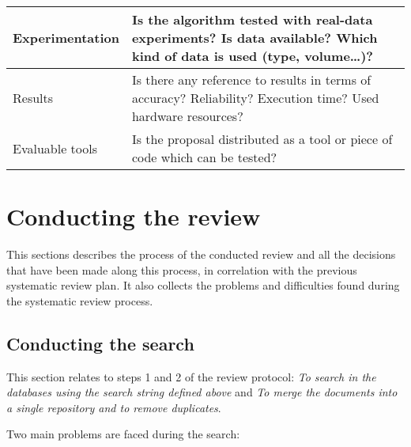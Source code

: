 \begin{table}[h]
\begin{tabular}{|p{4cm}|p{10cm}|}
\hline
Experimentation                         & Is the algorithm tested with real-data experiments? Is data available? Which kind of data is used (type, volume…)?                                                                                                   \\
\hline
Results                                 & Is there any reference to results in terms of accuracy? Reliability? Execution time? Used hardware resources?                                                                                                        \\
\hline
Evaluable tools                         & Is the proposal distributed as a tool or piece of code which can be tested?                                                                                                                                 
\\
\hline
\end{tabular}
\end{table}


\section{Conducting the review}
\label{Conducting}

This sections describes the process of the conducted review and all the decisions that have been made along this process, in correlation with the previous systematic review plan. It also collects the problems and difficulties found during the systematic review process.

\subsection{Conducting the search}

This section relates to steps 1 and 2 of the review protocol: \textit{To search in the databases using the search string defined above} and \textit{To merge the documents into a single repository and to remove duplicates}.

Two main problems are faced during the search:

